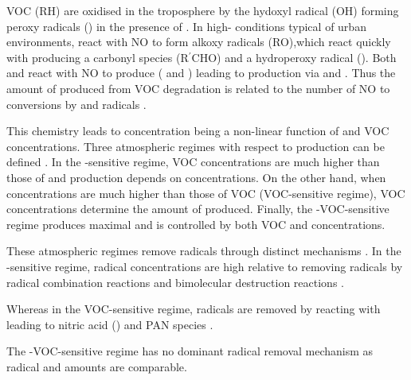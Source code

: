 VOC (RH) are oxidised in the troposphere by the hydoxyl radical (OH) forming peroxy radicals () in the presence of  . 
In high- conditions typical of urban environments,  react with NO  to form alkoxy radicals (RO),which react quickly with   producing a carbonyl species (R$^{\prime}$CHO) and a hydroperoxy radical ().
Both  and  react with NO to produce  ( and ) leading to  production via  and . 
Thus the amount of  produced from VOC degradation is related to the number of NO to  conversions by  and  radicals \citep{Atkinson:2000}.
\begin{reactionlist}
\end{reactionlist}

This chemistry leads to  concentration being a non-linear function of  and VOC concentrations.
Three atmospheric regimes with respect to  production can be defined \citep{Jenkin:2000}. 
In the -sensitive regime, VOC concentrations are much higher than those of  and  production depends on  concentrations. 
On the other hand, when  concentrations are much higher than those of VOC (VOC-sensitive regime), VOC concentrations determine the amount of  produced.
Finally, the -VOC-sensitive regime produces maximal  and is controlled by both VOC and  concentrations.

These atmospheric regimes remove radicals through distinct mechanisms \citep{Kleinman:1991}. 
In the -sensitive regime, radical concentrations are high relative to  removing radicals by radical combination reactions  and bimolecular destruction reactions  \citep{Kleinman:1994}.
\vspace{-5mm}
\begin{reactionlist}
\end{reactionlist}
Whereas in the VOC-sensitive regime, radicals are removed by reacting with  leading to nitric acid ()  and PAN species .
\vspace{-3mm}
\begin{reactionlist}
\end{reactionlist}
The -VOC-sensitive regime has no dominant radical removal mechanism as radical and  amounts are comparable.

